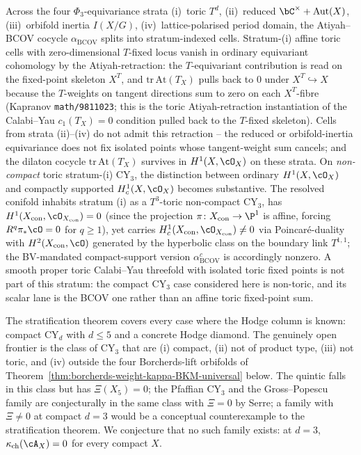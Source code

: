 \begin{remark}
\label{rem:bcov-stratum-i-vanishing}
Across the four $\Phi_3$-equivariance strata
\textup{(i)}~toric $T^d$,
\textup{(ii)}~reduced $\bC^\times + \mathrm{Aut}(X)$,
\textup{(iii)}~orbifold inertia $I(X/G)$,
\textup{(iv)}~lattice-polarised period domain, the Atiyah--BCOV
cocycle $\alpha_{\mathrm{BCOV}}$ splits into stratum-indexed cells.
Stratum-\textup{(i)} affine toric cells with zero-dimensional
\(T\)-fixed locus vanish in ordinary equivariant cohomology by the
Atiyah-retraction:
the \(T\)-equivariant contribution is read on the fixed-point
skeleton \(X^T\), and
$\mathrm{tr}\,\mathrm{At}(T_X)$ pulls back to $0$ under
$X^T \hookrightarrow X$ because the $T$-weights on tangent directions
sum to zero on each $X^T$-fibre
\textup{(}Kapranov \texttt{math/9811023}; this is the toric
Atiyah-retraction instantiation of the Calabi--Yau $c_1(T_X) = 0$
condition pulled back to the $T$-fixed skeleton\textup{).} Cells
from strata \textup{(ii)--(iv)} do not admit this retraction --
the reduced or orbifold-inertia equivariance does not fix isolated
points whose tangent-weight sum cancels; and the dilaton
cocycle $\mathrm{tr}\,\mathrm{At}(T_X)$ survives in
$H^1(X, \cO_X)$ on these strata. On \emph{non-compact} toric
stratum-(i) CY$_3$, the distinction between ordinary
$H^1(X, \cO_X)$ and compactly supported $H^1_c(X, \cO_X)$
becomes substantive. The resolved conifold inhabits
stratum \textup{(i)} as a $T^3$-toric non-compact CY$_3$, has
$H^1(X_{\mathrm{con}}, \cO_{X_{\mathrm{con}}}) = 0$ (since the
projection $\pi \colon X_{\mathrm{con}} \to \P^1$ is affine, forcing
$R^q \pi_* \cO = 0$ for $q \geq 1$), yet carries
$H^1_c(X_{\mathrm{con}}, \cO_{X_{\mathrm{con}}}) \neq 0$ via
Poincaré-duality with $H^2(X_{\mathrm{con}}, \cO)$ generated by the
hyperbolic class on the boundary link $T^{1,1}$; the BV-mandated
compact-support version $\alpha^c_{\mathrm{BCOV}}$ is accordingly
nonzero. A smooth proper toric Calabi--Yau threefold with isolated
toric fixed points is not part of this stratum: the compact CY$_3$
case considered here is non-toric, and its scalar lane is the BCOV
one rather than an affine toric fixed-point sum.
\end{remark}

\begin{remark}
\label{rem:cy-strat-open-frontier}
The stratification theorem covers every case where the Hodge column is
known: compact CY$_d$ with $d \leq 5$ and a concrete Hodge diamond. The
genuinely open frontier is the class of CY$_3$ that are (i) compact, (ii)
not of product type, (iii) not toric, and (iv) outside the four
Borcherds-lift orbifolds of
Theorem~\ref{thm:borcherds-weight-kappa-BKM-universal} below. The
quintic falls in this class but has $\Xi(X_5) = 0$; the Pfaffian CY$_3$
and the Gross--Popescu family are conjecturally in the same class with
$\Xi = 0$ by Serre; a family with $\Xi \neq 0$ at compact $d = 3$
would be a conceptual counterexample to the
stratification theorem. We conjecture that no such family exists: at
$d = 3$, $\kappa_{\mathrm{ch}}(\cA_X) = 0$ for every compact $X$.
\end{remark}

